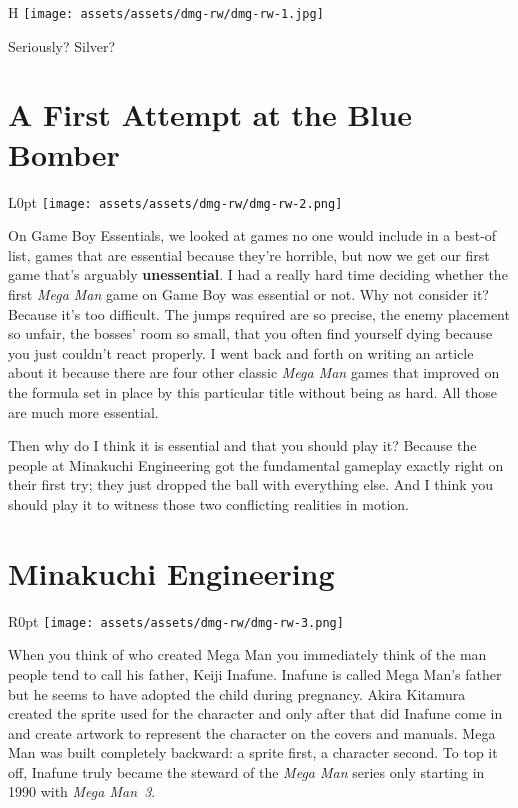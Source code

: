 \documentclass{book}
\begin{document}
\begin{wrapfigure}{H}{\linewidth}
\vskip 4pt
\centering \texttt{[image: assets/assets/dmg-rw/dmg-rw-1.jpg]}\par\pagetwodescription Seriously? Silver?\end{wrapfigure}
\clearpage

\FloatBarrier\needspace{5pt}\section*{A First Attempt at the Blue Bomber}\nopagebreak[4]

\begin{wrapfigure}{L}{0pt} \texttt{[image: assets/assets/dmg-rw/dmg-rw-2.png]}\end{wrapfigure}
On Game Boy Essentials, we looked at games no one would include in a best-of list, games that are essential because they’re horrible, but now we get our first game that’s arguably \textbf{unessential}. I had a really hard time deciding whether the first \emph{Mega Man} game on Game Boy was essential or not. Why not consider it? Because it’s too difficult. The jumps required are so precise, the enemy placement so unfair, the bosses’ room so small, that you often find yourself dying because you just couldn’t react properly. I went back and forth on writing an article about it because there are four other classic \emph{Mega Man} games that improved on the formula set in place by this particular title without being as hard. All those are much more essential.

Then why do I think it is essential and that you should play it? Because the people at Minakuchi Engineering got the fundamental gameplay exactly right on their first try; they just dropped the ball with everything else. And I think you should play it to witness those two conflicting realities in motion.

\FloatBarrier\needspace{5pt}\section*{Minakuchi Engineering}\nopagebreak[4]

\begin{wrapfigure}{R}{0pt} \texttt{[image: assets/assets/dmg-rw/dmg-rw-3.png]}\end{wrapfigure}
When you think of who created Mega Man you immediately think of the man people tend to call his father, Keiji Inafune. Inafune is called Mega Man’s father but he seems to have adopted the child during pregnancy. Akira Kitamura created the sprite used for the character and only after that did Inafune come in and create artwork to represent the character on the covers and manuals. Mega Man was built completely backward: a sprite first, a character second. To top it off, Inafune truly became the steward of the \emph{Mega Man} series only starting in 1990 with \emph{Mega Man 3}.
\end{document}
